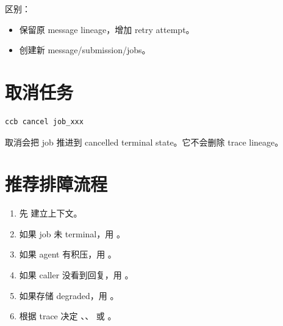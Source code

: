 区别：

\begin{itemize}
  \item {} 保留原 message lineage，增加 retry attempt。
  \item {} 创建新 message/submission/jobs。
\end{itemize}

\section{取消任务}

\begin{lstlisting}
ccb cancel job_xxx
\end{lstlisting}

取消会把 job 推进到 cancelled terminal state。它不会删除 trace lineage。

\section{推荐排障流程}

\begin{enumerate}
  \item 先  建立上下文。
  \item 如果 job 未 terminal，用 。
  \item 如果 agent 有积压，用 。
  \item 如果 caller 没看到回复，用 。
  \item 如果存储 degraded，用 。
  \item 根据 trace 决定 、、 或 。
\end{enumerate}
